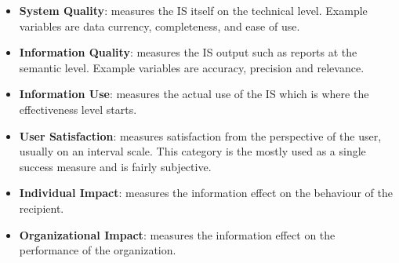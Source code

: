 \begin{itemize}
\item \textbf{System Quality}: measures the IS itself on the technical level. Example variables are data currency, completeness, and ease of use.
\item \textbf{Information Quality}: measures the IS output such as reports at the semantic level. Example variables are accuracy, precision and relevance.
\item \textbf{Information Use}: measures the actual use of the IS which is where the effectiveness level starts.
\item \textbf{User Satisfaction}: measures satisfaction from the perspective of the user, usually on an interval scale. This category is the mostly used as a single success measure and is fairly subjective.
\item \textbf{Individual Impact}: measures the information effect on the behaviour of the recipient.
\item \textbf{Organizational Impact}: measures the information effect on the performance of the organization.
\end{itemize}




